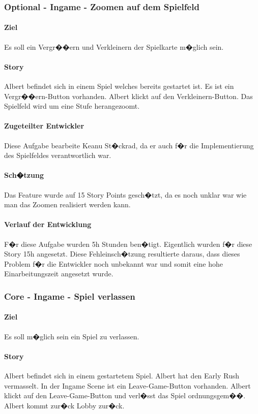 \documentclass[12pt, titlepage]{scrartcl}
\begin{document}
			\subsubsection{Optional - Ingame - Zoomen auf dem Spielfeld}
			\paragraph{Ziel} Es soll ein Vergr��ern und Verkleinern der Spielkarte m�glich sein.
			\paragraph{Story}Albert befindet sich in einem Spiel welches bereits gestartet ist. Es ist ein Vergr��ern-Button vorhanden. Albert klickt auf den  Verkleinern-Button. Das Spielfeld wird um eine Stufe herangezoomt.
			\paragraph{Zugeteilter Entwickler} Diese Aufgabe bearbeite Keanu St�ckrad, da er auch f�r die Implementierung des Spielfeldes verantwortlich war.
			\paragraph{Sch�tzung}
			Das Feature wurde auf 15 Story Points gesch�tzt, da es noch unklar war wie man das Zoomen realisiert werden kann.
			\paragraph{Verlauf der Entwicklung} 
			F�r diese Aufgabe wurden 5h Stunden ben�tigt. Eigentlich wurden f�r diese Story 15h angesetzt. Diese Fehleinsch�tzung resultierte daraus, dass dieses Problem f�r die Entwickler noch unbekannt war und somit eine hohe Einarbeitungszeit angesetzt wurde.
			
			\subsubsection{Core - Ingame - Spiel verlassen}
			\paragraph{Ziel} Es soll m�glich sein ein Spiel zu verlassen.
			\paragraph{Story} Albert befindet sich in einem gestartetem Spiel. Albert hat den Early Rush vermasselt. In der Ingame Scene ist ein Leave-Game-Button vorhanden. Albert klickt auf den Leave-Game-Button und verl�sst das Spiel ordnungsgem��. Albert kommt zur�ck Lobby zur�ck.
\end{document}
